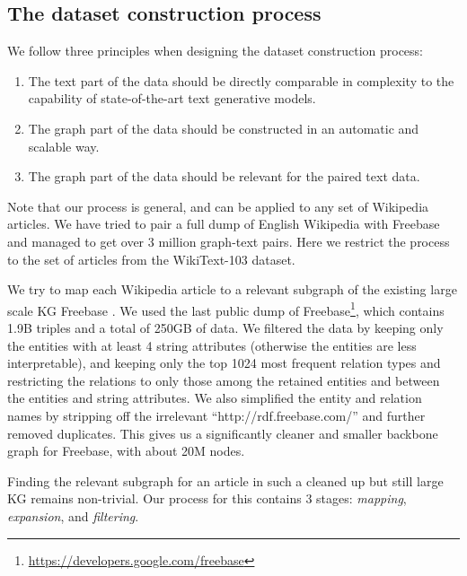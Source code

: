 \documentclass[11pt]{article}
\begin{document}
\subsection{The dataset construction process}\label{sec:data-creation}

We follow three principles when designing the dataset construction process:
\begin{enumerate}
    \item\label{enum:text-principle} The text part of the data should be directly comparable in complexity to the capability of state-of-the-art text generative models.
    \item\label{enum:graph-principle} The graph part of the data should be constructed in an automatic and scalable way.
    \item\label{enum:relevance-principle} The graph part of the data should be relevant for the paired text data.
\end{enumerate}

Note that our process is general, and can be applied to any set of Wikipedia articles.  We have tried to pair a full dump of English Wikipedia with Freebase and managed to get over 3 million graph-text pairs.  Here we restrict the process to the set of articles from the WikiText-103 dataset.

We try to map each Wikipedia article
to a relevant subgraph of the existing large scale KG Freebase \cite{bollacker2008freebase}.
We used the last public dump of Freebase\footnote{\url{https://developers.google.com/freebase}}, which contains 1.9B triples and a total of 250GB of data. We filtered the data by keeping only the entities with at least 4 string attributes (otherwise the entities are less interpretable), and keeping only the top 1024 most frequent relation types and restricting the relations to only those among the retained entities and between the entities and string attributes.  We also simplified the entity and relation names by stripping off the irrelevant ``http://rdf.freebase.com/'' and further removed duplicates. This gives us a significantly cleaner and smaller backbone graph for Freebase, with about 20M nodes.

Finding the relevant subgraph for an article in such a cleaned up but still large KG remains non-trivial.  Our process for this contains 3 stages: \emph{mapping}, \emph{expansion}, and \emph{filtering}.
\end{document}
